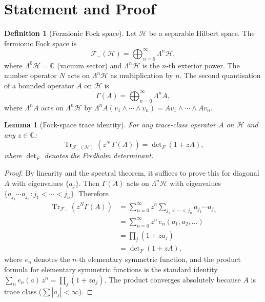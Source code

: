 \documentclass[12pt]{article}
\theoremstyle{plain}
\newtheorem{lemma}[theorem]{Lemma}
\theoremstyle{definition}
\newtheorem{definition}[theorem]{Definition}
\numberwithin{equation}{section}
\newcommand{\C}{\mathbb{C}}
\DeclareMathOperator{\Tr}{Tr}
\begin{document}
\section{Statement and Proof}\label{sec:universal}

\begin{definition}[Fermionic Fock space]\label{def:fock}
Let $\mathcal{H}$ be a separable Hilbert space.  The fermionic Fock
space is
\begin{equation}
\mathcal{F}_-(\mathcal{H}) = \bigoplus_{n=0}^{\infty}\Lambda^n\mathcal{H},
\end{equation}
where $\Lambda^0\mathcal{H}=\C$ (vacuum sector) and
$\Lambda^n\mathcal{H}$ is the $n$-th exterior power.  The number
operator $N$ acts on $\Lambda^n\mathcal{H}$ as multiplication by $n$.
The second quantisation of a bounded operator $A$ on $\mathcal{H}$ is
\begin{equation}
\Gamma(A) = \bigoplus_{n=0}^{\infty}\Lambda^n A,
\end{equation}
where $\Lambda^n A$ acts on $\Lambda^n\mathcal{H}$ by
$\Lambda^n A(v_1\wedge\cdots\wedge v_n)=Av_1\wedge\cdots\wedge Av_n$.
\end{definition}

\begin{lemma}[Fock-space trace identity]\label{lem:focktrace}
For any trace-class operator $A$ on $\mathcal{H}$ and any $z\in\C$:
\begin{equation}\label{eq:focktrace}
\Tr_{\mathcal{F}_-(\mathcal{H})}\!\left(z^N\,\Gamma(A)\right)
= \det\nolimits_F(1+zA),
\end{equation}
where $\det_F$ denotes the Fredholm determinant.
\end{lemma}

\begin{proof}
By linearity and the spectral theorem, it suffices to prove this for
diagonal $A$ with eigenvalues $\{a_j\}$.  Then $\Gamma(A)$ acts on
$\Lambda^n\mathcal{H}$ with eigenvalues
$\{a_{j_1}\cdots a_{j_n}:j_1<\cdots<j_n\}$.  Therefore
\begin{align}
\Tr_{\mathcal{F}_-}\!\left(z^N\Gamma(A)\right)
&= \sum_{n=0}^{\infty}z^n\sum_{j_1<\cdots<j_n}a_{j_1}\cdots a_{j_n}\\
&= \sum_{n=0}^{\infty}z^n\,e_n(a_1,a_2,\ldots)\\
&= \prod_j(1+za_j)\\
&= \det\nolimits_F(1+zA),
\end{align}
where $e_n$ denotes the $n$-th elementary symmetric function, and the
product formula for elementary symmetric functions is the standard
identity $\sum_n e_n(a)\,z^n=\prod_j(1+za_j)$.  The product converges
absolutely because $A$ is trace class ($\sum|a_j|<\infty$).
\end{proof}
\end{document}
